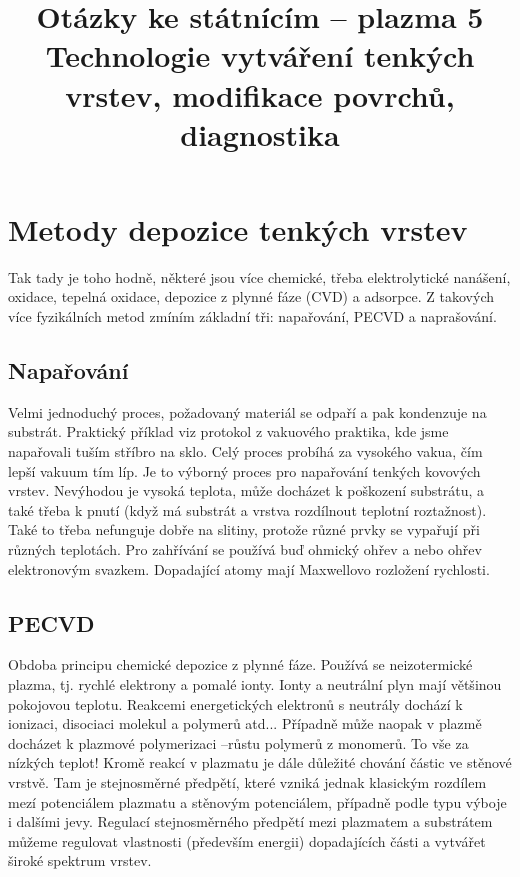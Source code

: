 \documentclass[12pt]{article}
\begin{document}
\title{Otázky ke státnícím -- plazma 5 \\
Technologie vytváření tenkých vrstev, modifikace povrchů, diagnostika}
\maketitle

\section{Metody depozice tenkých vrstev}
Tak tady je toho hodně, některé jsou více chemické, třeba elektrolytické nanášení, oxidace, tepelná oxidace, depozice z plynné fáze (CVD) a adsorpce. Z takových více fyzikálních metod zmíním základní tři: napařování, PECVD a naprašování. 

\subsection{Napařování}
Velmi jednoduchý proces, požadovaný materiál se odpaří a pak kondenzuje na substrát. Praktický příklad viz protokol z vakuového praktika, kde jsme napařovali tuším stříbro na sklo. Celý proces probíhá za vysokého vakua, čím lepší vakuum tím líp. Je to výborný proces pro napařování tenkých kovových vrstev. Nevýhodou je vysoká teplota, může docházet k poškození substrátu, a také třeba k pnutí (když má substrát a vrstva rozdílnout teplotní roztažnost). Také to třeba nefunguje dobře na slitiny, protože různé prvky se vypařují při různých teplotách. Pro zahřívání se používá buď ohmický ohřev a nebo ohřev elektronovým svazkem. Dopadající atomy mají Maxwellovo rozložení rychlosti.

\subsection{PECVD}
Obdoba principu chemické depozice z plynné fáze. Používá se neizotermické plazma, tj. rychlé elektrony a pomalé ionty. Ionty a neutrální plyn mají většinou pokojovou teplotu. Reakcemi energetických elektronů s neutrály dochází k ionizaci, disociaci molekul a polymerů atd... Případně může naopak v plazmě docházet k plazmové polymerizaci --růstu polymerů z monomerů. To vše za nízkých teplot! Kromě reakcí v plazmatu je dále důležité chování částic ve stěnové vrstvě. Tam je stejnosměrné předpětí, které vzniká jednak klasickým rozdílem mezí potenciálem plazmatu a stěnovým potenciálem, případně podle typu výboje i dalšími jevy. Regulací stejnosměrného předpětí mezi plazmatem a substrátem můžeme regulovat vlastnosti (především energii) dopadajících části a vytvářet široké spektrum vrstev.
\end{document}
